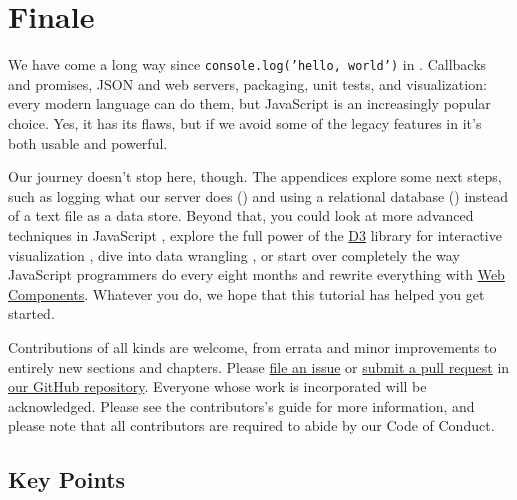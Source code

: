 \chapter{Finale}\label{s:finale}

We have come a long way since \texttt{console.log('hello,\ world')} in .
Callbacks and promises,
JSON and web servers,
packaging, unit tests, and visualization:
every modern language can do them,
but JavaScript is an increasingly popular choice.
Yes,
it has its flaws,
but if we avoid some of the legacy features in 
it's both usable and powerful.

Our journey doesn't stop here, though.
The appendices explore some next steps,
such as logging what our server does ()
and using a relational database () instead of a text file
as a data store.
Beyond that,
you could look at more advanced techniques in JavaScript \cite{Have2018},
explore the full power of the \href{https://d3js.org/}{D3} library for interactive visualization \cite{Meek2017},
dive into data wrangling \cite{Davi2018},
or start over completely the way JavaScript programmers do every eight months
and rewrite everything with \href{https://developer.mozilla.org/en-US/docs/Web/Web_Components}{Web Components}.
Whatever you do,
we hope that this tutorial has helped you get started.

Contributions of all kinds are welcome,
from errata and minor improvements to entirely new sections and chapters.
Please \href{https://github.com/software-tools-in-javascript/js4ds/issues}{file an issue}
or \href{https://github.com/software-tools-in-javascript/js4ds/pulls}{submit a pull request}
in \href{https://github.com/software-tools-in-javascript/js4ds/}{our GitHub repository}.
Everyone whose work is incorporated will be acknowledged.
Please see the contributors's guide for more information,
and please note that all contributors are required to abide by
our Code of Conduct.

\section*{Key Points}


